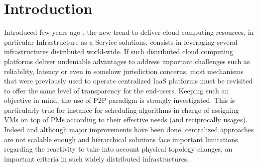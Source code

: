 \section{Introduction}
Introduced few years ago \cite{greenberg:sigcomm09}, the new trend to deliver
cloud computing resources, in particular Infrastructure as a Service solutions,
consists in leveraging several infrastructures  distributed world-wide. If
such distributed cloud computing platforms deliver undeniable advantages to address important
challenges such as reliability, latency or even in somehow jurisdiction
concerns, most mechanisms that were previously used to operate centralized IaaS
platforms must be revisited to offer the same level of transparency for the end-users. 
Keeping such an objective in mind, the use of P2P
paradigm is strongly investigated. 
This is particularly true for instance for scheduling algorithms in charge of assigning
VMs on top of PMs according to their effective needs (and reciprocally usages). 
Indeed and although major improvements have
been done, centralized approaches \cite{hermenier:2013} are not scalable enough
and hierarchical solutions \cite{feller:ccgrid2012} face important limitations
regarding the reactivity to take into account physical topology changes, an
important criteria in such widely distributed infrastructures. 
 
